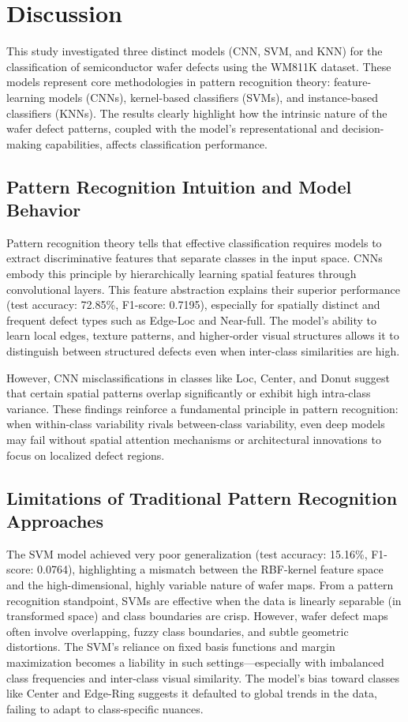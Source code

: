 \documentclass[conference]{IEEEtran}
\begin{document}
\section{Discussion}
This study investigated three distinct models (CNN, SVM, and KNN) for the classification of semiconductor wafer defects using the WM811K dataset. 
These models represent core methodologies in pattern recognition theory: feature-learning models (CNNs), kernel-based classifiers (SVMs), and instance-based classifiers (KNNs). 
The results clearly highlight how the intrinsic nature of the wafer defect patterns, coupled with the model's representational and decision-making capabilities, affects classification performance.

\subsection{Pattern Recognition Intuition and Model Behavior}
Pattern recognition theory tells that effective classification requires models to extract discriminative features that separate classes in the input space. 
CNNs embody this principle by hierarchically learning spatial features through convolutional layers. 
This feature abstraction explains their superior performance (test accuracy: 72.85\%, F1-score: 0.7195), especially for spatially distinct and frequent defect types such as Edge-Loc and Near-full. 
The model's ability to learn local edges, texture patterns, and higher-order visual structures allows it to distinguish between structured defects even when inter-class similarities are high.

However, CNN misclassifications in classes like Loc, Center, and Donut suggest that certain spatial patterns overlap significantly or exhibit high intra-class variance. 
These findings reinforce a fundamental principle in pattern recognition: when within-class variability rivals between-class variability, even deep models may fail without spatial attention mechanisms or architectural innovations to focus on localized defect regions.

\subsection{Limitations of Traditional Pattern Recognition Approaches}
The SVM model achieved very poor generalization (test accuracy: 15.16\%, F1-score: 0.0764), highlighting a mismatch between the RBF-kernel feature space and the high-dimensional, highly variable nature of wafer maps. 
From a pattern recognition standpoint, SVMs are effective when the data is linearly separable (in transformed space) and class boundaries are crisp. 
However, wafer defect maps often involve overlapping, fuzzy class boundaries, and subtle geometric distortions. 
The SVM's reliance on fixed basis functions and margin maximization becomes a liability in such settings—especially with imbalanced class frequencies and inter-class visual similarity. 
The model's bias toward classes like Center and Edge-Ring suggests it defaulted to global trends in the data, failing to adapt to class-specific nuances.
\end{document}
